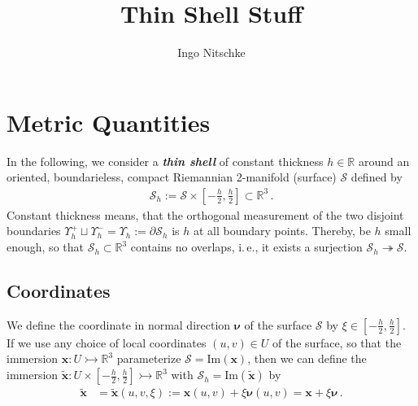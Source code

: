 \documentclass[a4paper,10pt]{scrartcl}
\title{Thin Shell Stuff}
\author{Ingo Nitschke}
\newcommand{\surf}{\mathcal{S}}
\newcommand{\surfh}{\surf_{h}}
\newcommand{\R}{\mathbb{R}}
\renewcommand{\Im}{\text{Im}}
\newcommand{\xb}{\mathbf{x}}
\newcommand{\txb}{\tilde{\xb}}
\newcommand{\nub}{\bm{\nu}}
\newcommand{\boundary}[1]{\Upsilon_{h}^{#1}}
\newcommand{\formPeriod}{\,\text{.}}
\newcommand{\ie}{i.\,e.}%
\newcommand{\newterm}[1]{\textbf{\textit{#1}}}
\begin{document}
\maketitle
\tableofcontents

\section{Metric Quantities}
In the following, we consider a \newterm{thin shell} of constant thickness \( h\in\R \) around an oriented, boundarieless, compact Riemannian 2-manifold (surface) \( \surf \)
defined by
\begin{align}
 \surfh := \surf\times\left[ -\frac{h}{2}, \frac{h}{2} \right] \subset \R^{3} \formPeriod
\end{align}
Constant thickness means, that the orthogonal measurement of the  two disjoint boundaries \( \boundary{+}\sqcup\boundary{-} = \boundary{} :=\partial\surfh \) is \( h \)
at all boundary points.
Thereby, be \( h \) small enough, so that  \( \surfh\subset \R^{3} \) contains no overlaps,
\ie, it exists a surjection \( \surfh \twoheadrightarrow \surf \).

\subsection{Coordinates}
We define the coordinate in normal direction \( \nub \) of the surface \( \surf \) by \( \xi\in\left[ -\frac{h}{2}, \frac{h}{2} \right] \).
If we use any choice of local coordinates \( (u,v)\in U \) of the surface, so that the immersion 
\( \xb:U \rightarrowtail \R^{3} \) parameterize \( \surf= \Im(\xb)\),
then we can define the immersion \( \txb: U\times\left[ -\frac{h}{2}, \frac{h}{2} \right] \rightarrowtail \R^{3} \) with  \( \surfh= \Im(\txb)\) by
\begin{align}
  \txb &= \txb(u,v,\xi) := \xb(u,v) + \xi\nub(u,v) = \xb + \xi\nub\formPeriod 
\end{align}
\end{document}
